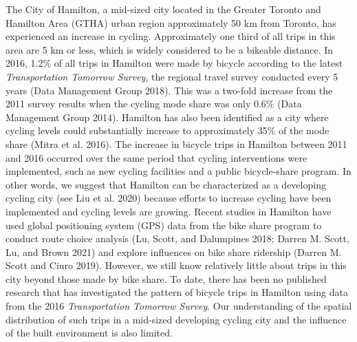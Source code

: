 \documentclass[smallextended]{svjour3}       %
\begin{document}
The City of Hamilton, a mid-sized city located in the Greater Toronto
and Hamilton Area (GTHA) urban region approximately 50 km from Toronto,
has experienced an increase in cycling. Approximately one third of all
trips in this area are 5 km or less, which is widely considered to be a
bikeable distance. In 2016, 1.2\% of all trips in Hamilton were made by
bicycle according to the latest \emph{Transportation Tomorrow Survey},
the regional travel survey conducted every 5 years (Data Management
Group 2018). This was a two-fold increase from the 2011 survey results
when the cycling mode share was only 0.6\% (Data Management Group 2014).
Hamilton has also been identified as a city where cycling levels could
substantially increase to approximately 35\% of the mode share (Mitra et
al. 2016). The increase in bicycle trips in Hamilton between 2011 and
2016 occurred over the same period that cycling interventions were
implemented, such as new cycling facilities and a public bicycle-share
program. In other words, we suggest that Hamilton can be characterized
as a developing cycling city (see Liu et al. 2020) because efforts to
increase cycling have been implemented and cycling levels are growing.
Recent studies in Hamilton have used global positioning system (GPS)
data from the bike share program to conduct route choice analysis (Lu,
Scott, and Dalumpines 2018; Darren M. Scott, Lu, and Brown 2021) and
explore influences on bike share ridership (Darren M. Scott and Ciuro
2019). However, we still know relatively little about trips in this city
beyond those made by bike share. To date, there has been no published
research that has investigated the pattern of bicycle trips in Hamilton
using data from the 2016 \emph{Transportation Tomorrow Survey}. Our
understanding of the spatial distribution of such trips in a mid-sized
developing cycling city and the influence of the built environment is
also limited.
\end{document}
